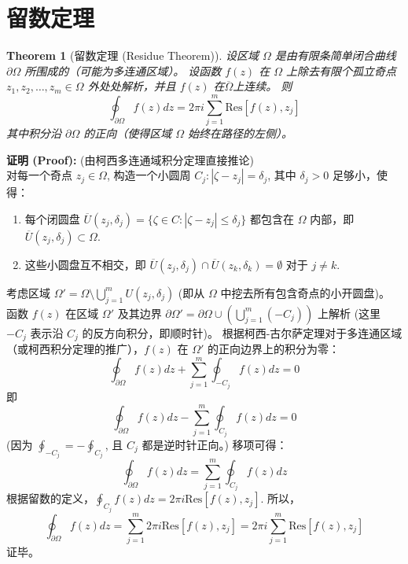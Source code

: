 \documentclass[linespread=1.5,openany]{book}%
\def\C{C}%
\def\diff{d}%
\theoremstyle{plain}
\newtheorem{theorem}{Theorem}
\newcommand{\diff}{\mathop{}\!\mathrm{d}}  %
\newcommand{\C}{\mathbb{C}}                %
\begin{document}
{{{{{{{\begin{enumerate}[label=(\roman*)]
									\end{enumerate}
								} %
								
								\section{留数定理 }
								{ %
									
									\begin{theorem}[留数定理 (Residue Theorem)] \label{thm:L16_residue_theorem}
										设区域 $\Omega$ 是由有限条简单闭合曲线 $\partial\Omega$ 所围成的（可能为多连通区域）。
										设函数 $f(z)$ 在 $\Omega$ 上除去有限个孤立奇点 $z_1, z_2, \dots, z_m \in \Omega$ 外处处解析，并且 $f(z)$ 在$\overline{\Omega}$上连续。
										则
										\[ \oint_{\partial\Omega} f(z) \diff z = 2\pi i \sum_{j=1}^{m} \text{Res}[f(z), z_j] \]
										其中积分沿 $\partial\Omega$ 的正向（使得区域 $\Omega$ 始终在路径的左侧）。
									\end{theorem}
									
									\textbf{证明 (Proof):} (由柯西多连通域积分定理直接推论) \\
									对每一个奇点 $z_j \in \Omega$, 构造一个小圆周 $C_j: |\zeta-z_j|=\delta_j$, 其中 $\delta_j > 0$ 足够小，使得：
									\begin{enumerate}
										\item 每个闭圆盘 $\overline{U}(z_j, \delta_j) = \{\zeta \in \C : |\zeta-z_j| \le \delta_j\}$ 都包含在 $\Omega$ 内部，即 $\overline{U}(z_j, \delta_j) \subset \Omega$.
										\item 这些小圆盘互不相交，即 $\overline{U}(z_j, \delta_j) \cap \overline{U}(z_k, \delta_k) = \emptyset$ 对于 $j \neq k$.
									\end{enumerate}
									考虑区域 $\Omega' = \Omega \setminus \bigcup_{j=1}^{m} U(z_j, \delta_j)$ (即从 $\Omega$ 中挖去所有包含奇点的小开圆盘)。
									函数 $f(z)$ 在区域 $\Omega'$ 及其边界 $\partial\Omega' = \partial\Omega \cup (\bigcup_{j=1}^{m} (-C_j))$ 上解析 (这里 $-C_j$ 表示沿 $C_j$ 的反方向积分，即顺时针)。
									根据柯西-古尔萨定理对于多连通区域（或柯西积分定理的推广），$f(z)$ 在 $\Omega'$ 的正向边界上的积分为零：
									\[ \oint_{\partial\Omega} f(z) \diff z + \sum_{j=1}^{m} \oint_{-C_j} f(z) \diff z = 0 \]
									即
									\[ \oint_{\partial\Omega} f(z) \diff z - \sum_{j=1}^{m} \oint_{C_j} f(z) \diff z = 0 \]
									(因为 $\oint_{-C_j} = -\oint_{C_j}$, 且 $C_j$ 都是逆时针正向。)
									移项可得：
									\[ \oint_{\partial\Omega} f(z) \diff z = \sum_{j=1}^{m} \oint_{C_j} f(z) \diff z \]
									根据留数的定义，$\oint_{C_j} f(z) \diff z = 2\pi i \text{Res}[f(z), z_j]$.
									所以，
									\[ \oint_{\partial\Omega} f(z) \diff z = \sum_{j=1}^{m} 2\pi i \text{Res}[f(z), z_j] = 2\pi i \sum_{j=1}^{m} \text{Res}[f(z), z_j] \]
									证毕。
									\vspace{\baselineskip}
									
}}}}}}}
\end{document}
